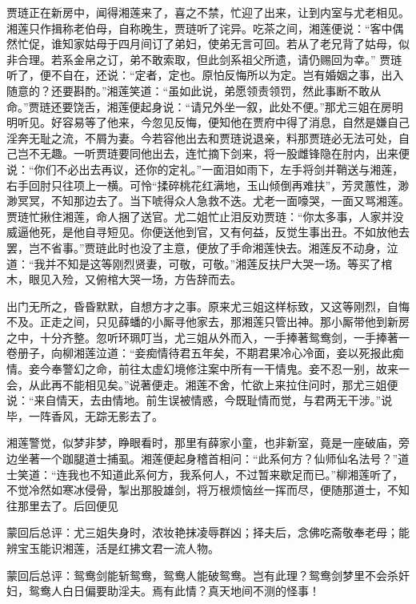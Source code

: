 \begin{parag}
    贾琏正在新房中，闻得湘莲来了，喜之不禁，忙迎了出来，让到内室与尤老相见。湘莲只作揖称老伯母，自称晚生，贾琏听了诧异。吃茶之间，湘莲便说：“客中偶然忙促，谁知家姑母于四月间订了弟妇，使弟无言可回。若从了老兄背了姑母，似非合理。若系金帛之订，弟不敢索取，但此剑系祖父所遗，请仍赐回为幸。” 贾琏听了，便不自在，还说：“定者，定也。原怕反悔所以为定。岂有婚姻之事，出入随意的？还要斟酌。”湘莲笑道：“虽如此说，弟愿领责领罚，然此事断不敢从命。”贾琏还要饶舌，湘莲便起身说：“请兄外坐一叙，此处不便。”那尤三姐在房明明听见。好容易等了他来，今忽见反悔，便知他在贾府中得了消息，自然是嫌自己淫奔无耻之流，不屑为妻。今若容他出去和贾琏说退亲，料那贾琏必无法可处，自己岂不无趣。一听贾琏要同他出去，连忙摘下剑来，将一股雌锋隐在肘内，出来便说：“你们不必出去再议，还你的定礼。”一面泪如雨下，左手将剑并鞘送与湘莲，右手回肘只往项上一横。可怜“揉碎桃花红满地，玉山倾倒再难扶”，芳灵蕙性，渺渺冥冥，不知那边去了。当下唬得众人急救不迭。尤老一面嚎哭，一面又骂湘莲。贾琏忙揪住湘莲，命人捆了送官。尤二姐忙止泪反劝贾琏：“你太多事，人家并没威逼他死，是他自寻短见。你便送他到官，又有何益，反觉生事出丑。不如放他去罢，岂不省事。”贾琏此时也没了主意，便放了手命湘莲快去。湘莲反不动身，泣道：“我并不知是这等刚烈贤妻，可敬，可敬。”湘莲反扶尸大哭一场。等买了棺木，眼见入殓，又俯棺大哭一场，方告辞而去。
\end{parag}


\begin{parag}
    出门无所之，昏昏默默，自想方才之事。原来尤三姐这样标致，又这等刚烈，自悔不及。正走之间，只见薛蟠的小厮寻他家去，那湘莲只管出神。那小厮带他到新房之中，十分齐整。忽听环珮叮当，尤三姐从外而入，一手捧著鸳鸯剑，一手捧著一卷册子，向柳湘莲泣道：“妾痴情待君五年矣，不期君果冷心冷面，妾以死报此痴情。妾今奉警幻之命，前往太虚幻境修注案中所有一干情鬼。妾不忍一别，故来一会，从此再不能相见矣。”说著便走。湘莲不舍，忙欲上来拉住问时，那尤三姐便说：“来自情天，去由情地。前生误被情惑，今既耻情而觉，与君两无干涉。”说毕，一阵香风，无踪无影去了。
\end{parag}


\begin{parag}
    湘莲警觉，似梦非梦，睁眼看时，那里有薛家小童，也非新室，竟是一座破庙，旁边坐著一个跏腿道士捕虱。湘莲便起身稽首相问：“此系何方？仙师仙名法号？”道士笑道：“连我也不知道此系何方，我系何人，不过暂来歇足而已。”柳湘莲听了，不觉冷然如寒冰侵骨，掣出那股雄剑，将万根烦恼丝一挥而尽，便随那道士，不知往那里去了。后回便见
\end{parag}


\begin{parag}
    \begin{note}蒙回后总评：尤三姐失身时，浓妆艳抹凌辱群凶；择夫后，念佛吃斋敬奉老母；能辨宝玉能识湘莲，活是红拂文君一流人物。\end{note}
\end{parag}


\begin{parag}
    \begin{note}蒙回后总评：鸳鸯剑能斩鸳鸯，鸳鸯人能破鸳鸯。岂有此理？鸳鸯剑梦里不会杀奸妇，鸳鸯人白日偏要助淫夫。焉有此情？真天地间不测的怪事！\end{note}
\end{parag}
